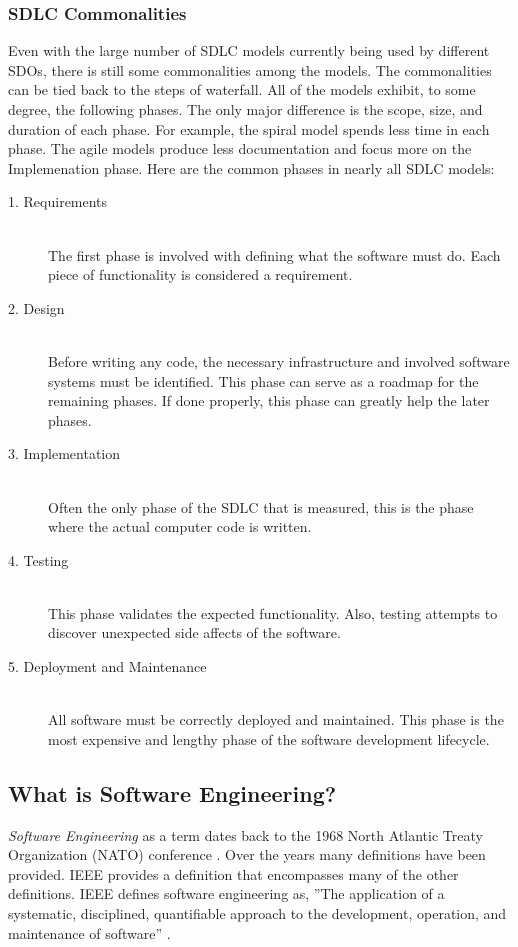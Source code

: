 \documentclass[SDSUThesis.tex]{subfiles}
\begin{document}
    \subsubsection{SDLC Commonalities}
        Even with the large number of SDLC models currently being used by different SDOs,
        there is still some commonalities among the models.  The 
        commonalities can be tied back to the steps of waterfall.  All of the models
        exhibit, to some degree, the following phases. The only major difference is 
        the scope, size, and duration of each phase.  For example, the spiral
        model spends less time in each phase.  The agile models produce less
        documentation and focus more on the Implemenation phase. Here are
        the common phases in nearly all SDLC models:
        \begin{description}
            \item[1. Requirements] \hfill \\ The first phase is involved 
                with defining what the software must do.  Each piece of 
                functionality is considered a requirement.  
            \item[2. Design] \hfill \\ Before writing any code, the 
                necessary infrastructure and involved software systems
                must be identified. This phase can serve as a roadmap for the 
                remaining phases. If done properly, this phase can greatly 
                help the later phases.
            \item[3. Implementation] \hfill \\ Often the only phase of the SDLC 
                that is measured, this is the phase where the actual computer
                code is written.
            \item[4. Testing] \hfill \\ This phase validates the expected 
                functionality.  Also, testing attempts to discover unexpected
                side affects of the software.
            \item[5. Deployment and Maintenance] \hfill \\ All software must 
                be correctly deployed and maintained.  This phase is the 
                most expensive and lengthy phase of the software
                development lifecycle.
        \end{description}
        
\subsection{What is Software Engineering?}
    \textit{Software Engineering} as a term dates back to the 
    1968 North Atlantic Treaty Organization (NATO) conference \cite{Tsui2013}. Over the 
    years many definitions have been provided.  IEEE provides a definition that encompasses many of the
    other definitions.  IEEE defines software engineering as, 
    ''The application of a systematic, disciplined, quantifiable approach to the development, operation, and maintenance of software''
    \cite{Ieee1990}.
    
\end{document}
